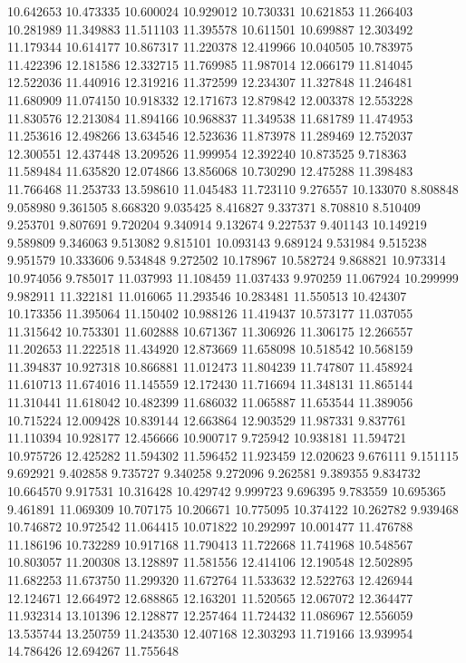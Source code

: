 10.642653
10.473335
10.600024
10.929012
10.730331
10.621853
11.266403
10.281989
11.349883
11.511103
11.395578
10.611501
10.699887
12.303492
11.179344
10.614177
10.867317
11.220378
12.419966
10.040505
10.783975
11.422396
12.181586
12.332715
11.769985
11.987014
12.066179
11.814045
12.522036
11.440916
12.319216
11.372599
12.234307
11.327848
11.246481
11.680909
11.074150
10.918332
12.171673
12.879842
12.003378
12.553228
11.830576
12.213084
11.894166
10.968837
11.349538
11.681789
11.474953
11.253616
12.498266
13.634546
12.523636
11.873978
11.289469
12.752037
12.300551
12.437448
13.209526
11.999954
12.392240
10.873525
9.718363
11.589484
11.635820
12.074866
13.856068
10.730290
12.475288
11.398483
11.766468
11.253733
13.598610
11.045483
11.723110
9.276557
10.133070
8.808848
9.058980
9.361505
8.668320
9.035425
8.416827
9.337371
8.708810
8.510409
9.253701
9.807691
9.720204
9.340914
9.132674
9.227537
9.401143
10.149219
9.589809
9.346063
9.513082
9.815101
10.093143
9.689124
9.531984
9.515238
9.951579
10.333606
9.534848
9.272502
10.178967
10.582724
9.868821
10.973314
10.974056
9.785017
11.037993
11.108459
11.037433
9.970259
11.067924
10.299999
9.982911
11.322181
11.016065
11.293546
10.283481
11.550513
10.424307
10.173356
11.395064
11.150402
10.988126
11.419437
10.573177
11.037055
11.315642
10.753301
11.602888
10.671367
11.306926
11.306175
12.266557
11.202653
11.222518
11.434920
12.873669
11.658098
10.518542
10.568159
11.394837
10.927318
10.866881
11.012473
11.804239
11.747807
11.458924
11.610713
11.674016
11.145559
12.172430
11.716694
11.348131
11.865144
11.310441
11.618042
10.482399
11.686032
11.065887
11.653544
11.389056
10.715224
12.009428
10.839144
12.663864
12.903529
11.987331
9.837761
11.110394
10.928177
12.456666
10.900717
9.725942
10.938181
11.594721
10.975726
12.425282
11.594302
11.596452
11.923459
12.020623
9.676111
9.151115
9.692921
9.402858
9.735727
9.340258
9.272096
9.262581
9.389355
9.834732
10.664570
9.917531
10.316428
10.429742
9.999723
9.696395
9.783559
10.695365
9.461891
11.069309
10.707175
10.206671
10.775095
10.374122
10.262782
9.939468
10.746872
10.972542
11.064415
10.071822
10.292997
10.001477
11.476788
11.186196
10.732289
10.917168
11.790413
11.722668
11.741968
10.548567
10.803057
11.200308
13.128897
11.581556
12.414106
12.190548
12.502895
11.682253
11.673750
11.299320
11.672764
11.533632
12.522763
12.426944
12.124671
12.664972
12.688865
12.163201
11.520565
12.067072
12.364477
11.932314
13.101396
12.128877
12.257464
11.724432
11.086967
12.556059
13.535744
13.250759
11.243530
12.407168
12.303293
11.719166
13.939954
14.786426
12.694267
11.755648
